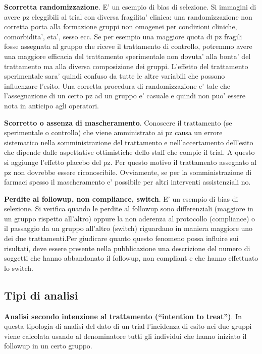 \documentclass[]{book}
\begin{document}
\textbf{Scorretta randomizzazione}. E' un esempio di bias di selezione. Si immagini di avere pz eleggibili al trial con diversa fragilita' clinica: una randomizzazione non corretta porta alla formazione gruppi non omogenei per condizioni cliniche, comorbidita', eta', sesso ecc. Se per esempio una maggiore quota di pz fragili fosse assegnata al gruppo che riceve il trattamento di controllo, potremmo avere una maggiore efficacia del trattamento sperimentale non dovuta' alla bonta' del trattamento ma alla diversa composizione dei gruppi. L'effetto del trattamento sperimentale sara' quindi confuso da tutte le altre variabili che possono influenzare l'esito. Una corretta procedura di randomizzazione e' tale che l'assegnazione di un certo pz ad un gruppo e' casuale e quindi non puo' essere nota in anticipo agli operatori.

\textbf{Scorretto o assenza di mascheramento}. Conoscere il trattamento (se sperimentale o controllo) che viene amministrato ai pz causa un errore sistematico nella somministrazione del trattamento e nell'accertamento dell'esito che dipende dalle aspettative ottimistiche dello staff che compie il trial. A questo si aggiunge l'effetto placebo del pz. Per questo motivo il trattamento assegnato al pz non dovrebbe essere riconoscibile. Ovviamente, se per la somministrazione di farmaci spesso il mascheramento e' possibile per altri interventi assistenziali no.

\textbf{Perdite al followup, non compliance, switch}. E' un esempio di bias di selezione. Si verifica quando le perdite al followup sono differenziali (maggiore in un gruppo rispetto all'altro) oppure la non aderenza al protocollo (compliance) o il passaggio da un gruppo all'altro (switch) riguardano in maniera maggiore uno dei due trattamenti.Per giudicare quanto questo fenomeno possa influire sui risultati, deve essere presente nella pubblicazione una descrizione del numero di soggetti che hanno abbandonato il followup, non compliant e che hanno effettuato lo switch.

\hypertarget{tipi-di-analisi}{%
\subsection{Tipi di analisi}\label{tipi-di-analisi}}

\textbf{Analisi secondo intenzione al trattamento (``intention to treat'')}. In questa tipologia di analisi del dato di un trial l'incidenza di esito nei due gruppi viene calcolata usando al denominatore tutti gli individui che hanno iniziato il followup in un certo gruppo.
\end{document}
